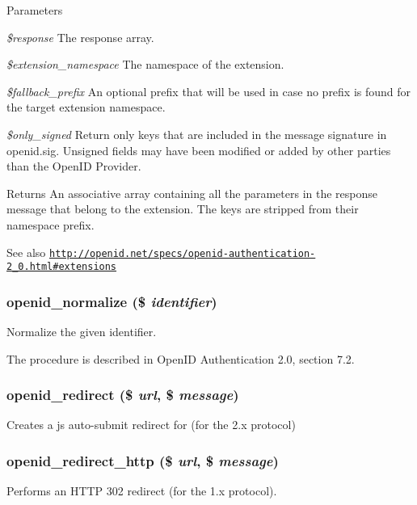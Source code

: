 \begin{DoxyParams}{Parameters}
\item[{\em \$response}]The response array. \item[{\em \$extension\_\-namespace}]The namespace of the extension. \item[{\em \$fallback\_\-prefix}]An optional prefix that will be used in case no prefix is found for the target extension namespace. \item[{\em \$only\_\-signed}]Return only keys that are included in the message signature in openid.sig. Unsigned fields may have been modified or added by other parties than the OpenID Provider.\end{DoxyParams}
\begin{DoxyReturn}{Returns}
An associative array containing all the parameters in the response message that belong to the extension. The keys are stripped from their namespace prefix.
\end{DoxyReturn}
\begin{DoxySeeAlso}{See also}
\href{http://openid.net/specs/openid-authentication-2_0.html#extensions}{\tt http://openid.net/specs/openid-\/authentication-\/2\_\-0.html\#extensions} 
\end{DoxySeeAlso}
\hypertarget{openid_8inc_a7ff842426a1f176ec3f247c5fd2ed7b2}{
\subsubsection[{openid\_\-normalize}]{\setlength{\rightskip}{0pt plus 5cm}openid\_\-normalize (\$ {\em identifier})}}
\label{openid_8inc_a7ff842426a1f176ec3f247c5fd2ed7b2}
Normalize the given identifier.

The procedure is described in OpenID Authentication 2.0, section 7.2. \hypertarget{openid_8inc_a6836e61a578613959fe00ca83209ae2f}{
\subsubsection[{openid\_\-redirect}]{\setlength{\rightskip}{0pt plus 5cm}openid\_\-redirect (\$ {\em url}, \/  \$ {\em message})}}
\label{openid_8inc_a6836e61a578613959fe00ca83209ae2f}
Creates a js auto-\/submit redirect for (for the 2.x protocol) \hypertarget{openid_8inc_a3c8b7c23742c62aae323c74c8c0f9915}{
\subsubsection[{openid\_\-redirect\_\-http}]{\setlength{\rightskip}{0pt plus 5cm}openid\_\-redirect\_\-http (\$ {\em url}, \/  \$ {\em message})}}
\label{openid_8inc_a3c8b7c23742c62aae323c74c8c0f9915}
Performs an HTTP 302 redirect (for the 1.x protocol). 